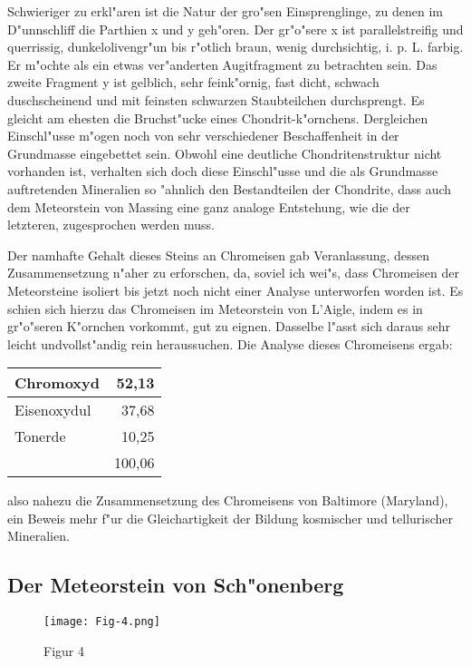 \documentclass[a4paper, 11pt, oneside]{article}
\begin{document}
Schwieriger zu erkl"aren ist die Natur der gro"sen Einsprenglinge, zu denen im D"unnschliff die Parthien x und y geh"oren. Der gr"o"sere x ist parallelstreifig und querrissig, dunkelolivengr"un bis r"otlich braun, wenig durchsichtig, i. p. L. farbig. Er m"ochte als ein etwas ver"anderten Augitfragment zu betrachten sein. Das zweite Fragment y ist gelblich, sehr feink"ornig, fast dicht, schwach duschscheinend und mit feinsten schwarzen Staubteilchen durchsprengt. Es gleicht am ehesten die Bruchst"ucke eines Chondrit-k"ornchens. Dergleichen Einschl"usse m"ogen noch von sehr verschiedener Beschaffenheit in der Grundmasse eingebettet sein. Obwohl eine deutliche Chondritenstruktur nicht vorhanden ist, verhalten sich doch diese Einschl"usse und die als Grundmasse auftretenden Mineralien so "ahnlich den Bestandteilen der Chondrite, dass auch dem Meteorstein von Massing eine ganz analoge Entstehung, wie die der letzteren, zugesprochen werden muss.

Der namhafte Gehalt dieses Steins an Chromeisen gab Veranlassung, dessen Zusammensetzung n"aher zu erforschen, da, soviel ich wei"s, dass Chromeisen der Meteorsteine isoliert bis jetzt noch nicht einer Analyse unterworfen worden ist. Es schien sich hierzu das Chromeisen im Meteorstein von L'Aigle, indem es in gr"o"seren K"ornchen vorkommt, gut zu eignen. Dasselbe l"asst sich daraus sehr leicht undvollst"andig rein heraussuchen. Die Analyse dieses Chromeisens ergab:
\begin{center}
    \begin{tabular}{ |l|r| } 
    \hline
    Chromoxyd & 52,13\\\hline
    Eisenoxydul & 37,68\\\hline
    Tonerde & 10,25\\\hline
    & 100,06\\
    \hline
    \end{tabular}
\end{center}
also nahezu die Zusammensetzung des Chromeisens von Baltimore (Maryland), ein Beweis mehr f"ur die Gleichartigkeit der Bildung kosmischer und tellurischer Mineralien.
\clearpage
\subsection{Der Meteorstein von Sch"onenberg}
\begin{figure}[h]
\centering
\texttt{[image: Fig-4.png]}
\caption{Figur 4}
\end{figure}
\end{document}
